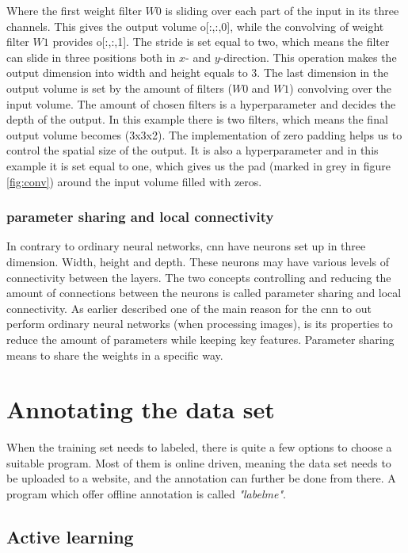 \documentclass[USenglish]{ifimaster}  %
\begin{document}
Where the first weight filter $W0$ is sliding over each part of the input in its three channels. This gives the output volume o[:,:,0], while the convolving of weight filter $W1$ provides o[:,:,1]. The stride is set equal to two, which means the filter can slide in three positions both in $x$- and $y$-direction. This operation makes the output dimension into width and height equals to 3. The last dimension in the output volume is set by the amount of filters ($W0$ and $W1$) convolving over the input volume. The amount of chosen filters is a hyperparameter and decides the depth of the output. In this example there is two filters, which means the final output volume becomes (3x3x2). 
The implementation of zero padding helps us to control the spatial size of the output. It is also a hyperparameter and in this example it is set equal to one, which gives us the pad (marked in grey in figure \ref{fig:conv}) around the input volume filled with zeros. 
\newline
\newline
\subsubsection{parameter sharing and local connectivity}
In contrary to ordinary neural networks, \ac{cnn} have neurons set up in three dimension. Width, height and depth. These neurons may have various levels of connectivity between the layers. The two concepts controlling and reducing the amount of connections between the neurons is called parameter sharing and local connectivity. As earlier described one of the main reason for the \ac{cnn} to out perform ordinary neural networks (when processing images), is its properties to reduce the amount of parameters while keeping key features.
\newline
Parameter sharing means to share the weights in a specific way.  
\section{Annotating the data set}
When the training set needs to labeled, there is quite a few options to choose a suitable program. Most of them is online driven, meaning the data set needs to be uploaded to a website, and the annotation can further be done from there. A program which offer offline annotation is called \textit{"labelme"}\cite{website:labelme}. 
\subsection{Active learning}
\end{document}
